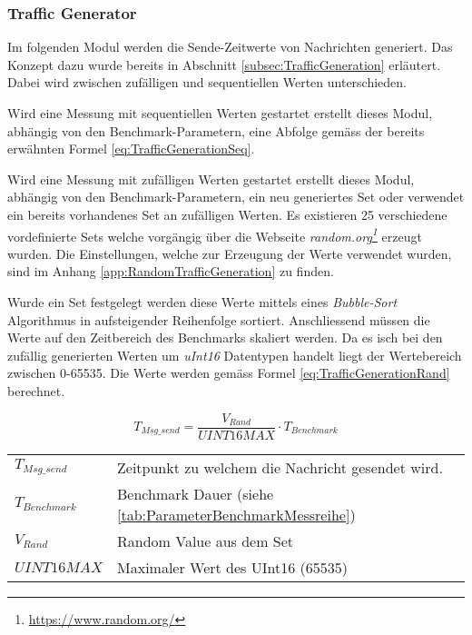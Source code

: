 \subsubsection{Traffic Generator}\label{subsubsec:TrafficGenerator}
Im folgenden Modul werden die Sende-Zeitwerte von Nachrichten generiert.
Das Konzept dazu wurde bereits in Abschnitt \ref{subsec:TrafficGeneration} erläutert.
Dabei wird zwischen zufälligen und sequentiellen Werten unterschieden.  

Wird eine Messung mit sequentiellen Werten gestartet erstellt dieses Modul, abhängig von den Benchmark-Parametern, eine Abfolge gemäss der bereits erwähnten Formel \ref{eq:TrafficGenerationSeq}.

Wird eine Messung mit zufälligen Werten gestartet erstellt dieses Modul, abhängig von den Benchmark-Parametern, ein neu generiertes Set oder verwendet ein bereits vorhandenes Set an zufälligen Werten.
Es existieren 25 verschiedene vordefinierte Sets welche vorgängig über die Webseite \textit{random.org\footnote{\url{https://www.random.org/}}} erzeugt wurden.
Die Einstellungen, welche zur Erzeugung der Werte verwendet wurden, sind im Anhang \ref{app:RandomTrafficGeneration} zu finden.

Wurde ein Set festgelegt werden diese Werte mittels eines \textit{Bubble-Sort} Algorithmus in aufsteigender Reihenfolge sortiert.
Anschliessend müssen die Werte auf den Zeitbereich des Benchmarks skaliert werden.
Da es isch bei den zufällig generierten Werten um \textit{uInt16} Datentypen handelt liegt der Wertebereich zwischen 0-65535.
Die Werte werden gemäss Formel \ref{eq:TrafficGenerationRand} berechnet. 

\begin{equation}\label{eq:TrafficGenerationRand}
T_{Msg\_send} =  \frac{V_{Rand}}{UINT16MAX} \cdot T_{Benchmark}
\end{equation}

\begin{small}
	\begin{center}
		\begin{tabular}{ll}
			$T_{Msg\_send}$ & Zeitpunkt zu welchem die Nachricht gesendet wird.\\
			$T_{Benchmark}$ & Benchmark Dauer (siehe \ref{tab:ParameterBenchmarkMessreihe})\\
			$V_{Rand}$ & Random Value aus dem Set \\
			$UINT16MAX$ & Maximaler Wert des UInt16 (65535) \\
		\end{tabular}
	\end{center}
\end{small}

